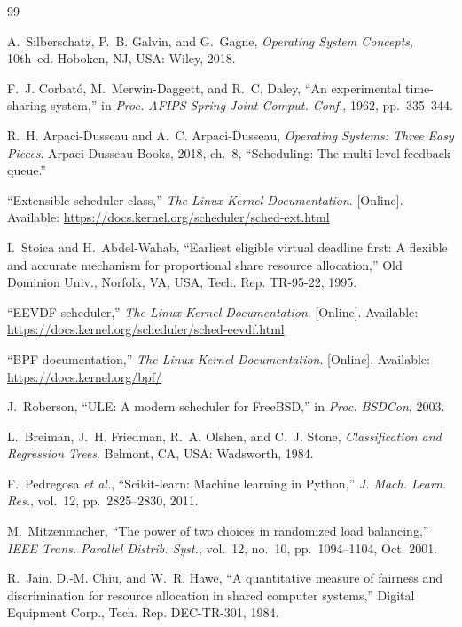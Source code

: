 \documentclass[conference]{IEEEtran}
\begin{document}
\begin{thebibliography}{99}

A.~Silberschatz, P.~B. Galvin, and G.~Gagne, \emph{Operating System Concepts}, 10th~ed.
Hoboken, NJ, USA: Wiley, 2018.

F.~J. Corbat\'{o}, M.~Merwin-Daggett, and R.~C. Daley, ``An experimental time-sharing system,''
in \emph{Proc. AFIPS Spring Joint Comput. Conf.}, 1962, pp.~335--344.

R.~H. Arpaci-Dusseau and A.~C. Arpaci-Dusseau, \emph{Operating Systems: Three Easy Pieces}.
Arpaci-Dusseau Books, 2018, ch.~8, ``Scheduling: The multi-level feedback queue.''

``Extensible scheduler class,'' \emph{The Linux Kernel Documentation}. [Online]. Available:
\url{https://docs.kernel.org/scheduler/sched-ext.html}

I.~Stoica and H.~Abdel-Wahab, ``Earliest eligible virtual deadline first: A flexible and accurate
mechanism for proportional share resource allocation,'' Old Dominion Univ., Norfolk, VA, USA,
Tech. Rep. TR-95-22, 1995.

``EEVDF scheduler,'' \emph{The Linux Kernel Documentation}. [Online]. Available:
\url{https://docs.kernel.org/scheduler/sched-eevdf.html}

``BPF documentation,'' \emph{The Linux Kernel Documentation}. [Online]. Available:
\url{https://docs.kernel.org/bpf/}

J.~Roberson, ``ULE: A modern scheduler for FreeBSD,'' in \emph{Proc. BSDCon}, 2003.

L.~Breiman, J.~H. Friedman, R.~A. Olshen, and C.~J. Stone, \emph{Classification and Regression
Trees}. Belmont, CA, USA: Wadsworth, 1984.

F.~Pedregosa \emph{et al.}, ``Scikit-learn: Machine learning in Python,'' \emph{J. Mach. Learn.
Res.}, vol.~12, pp.~2825--2830, 2011.

M.~Mitzenmacher, ``The power of two choices in randomized load balancing,'' \emph{IEEE Trans.
Parallel Distrib. Syst.}, vol.~12, no.~10, pp.~1094--1104, Oct. 2001.

R.~Jain, D.-M. Chiu, and W.~R. Hawe, ``A quantitative measure of fairness and discrimination for
resource allocation in shared computer systems,'' Digital Equipment Corp., Tech. Rep. DEC-TR-301,
1984.


\end{thebibliography}
\end{document}

